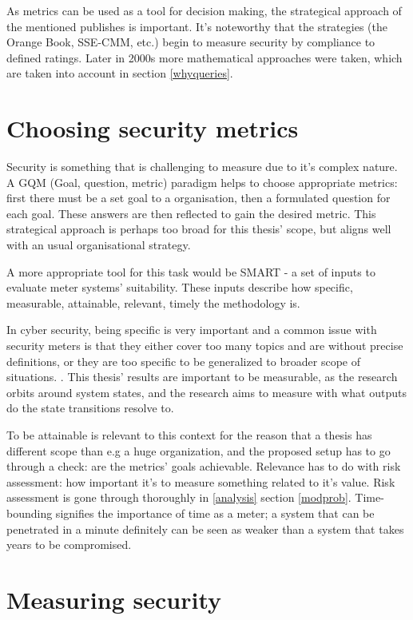 As metrics can be used as a tool for decision making, the strategical
approach of the mentioned publishes is important. It's noteworthy that
the strategies (the Orange Book, SSE-CMM, etc.) begin to measure
security by compliance to defined ratings. Later in 2000s more
mathematical approaches were taken, which are taken into account in
section \ref{whyqueries}. \cite{bayuk2013measuring}

\section{Choosing security metrics} \label{choosingsecmet}

Security is something that is challenging to measure due to it's
complex nature. A GQM (Goal, question, metric) paradigm helps to
choose appropriate metrics: first there must be a set goal to a
organisation, then a formulated question for each goal. These answers
are then reflected to gain the desired metric. This strategical
approach is perhaps too broad for this thesis' scope, but aligns well
with an usual organisational strategy. \cite{papazov2019cybersecurity}

A more appropriate tool for this task would be SMART - a set of inputs
to evaluate meter systems' suitability. These inputs describe how
specific, measurable, attainable, relevant, timely the methodology
is.\cite{payne2006guide}

In cyber security, being specific is very important and a common issue
with security meters is that they either cover too many topics and are
without precise definitions, or they are too specific to be
generalized to broader scope of
situations. \cite{wang2005information}. This thesis' results are
important to be measurable, as the research orbits around system
states, and the research aims to measure with what outputs do the
state transitions resolve to.

To be attainable is relevant to this context for the reason that a
thesis has different scope than e.g a huge organization, and the
proposed setup has to go through a check: are the metrics' goals
achievable. Relevance has to do with risk assessment: how important
it's to measure something related to it's value. Risk assessment is
gone through thoroughly in \ref{analysis} section
\ref{modprob}. Time-bounding signifies the importance of time as a
meter; a system that can be penetrated in a minute definitely can be
seen as weaker than a system that takes years to be compromised.

\section{Measuring security}

